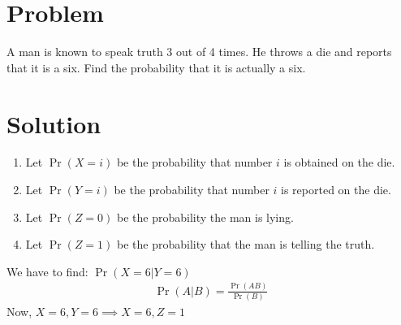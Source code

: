 \documentclass[journal,12pt,twocolumn]{IEEEtran}
\begin{document}
\section*{Problem}
A man is known to speak truth 3 out of 4 times. He throws a die and reports that it is a six. Find the probability that it is actually a six.
\section*{Solution}
\begin{enumerate}
    \item Let $\Pr(X=i)$ be the probability that number $i$ is obtained on the die.
    \item Let $\Pr(Y=i)$ be the probability that number $i$ is reported on the die.
    \item Let $\Pr(Z=0)$ be the probability the man is lying.
    \item Let $\Pr(Z=1)$ be the probability that the man is telling the truth.
\end{enumerate}
We have to find: $\Pr(X=6|Y=6)$
\begin{align}
\Pr(A|B)=\frac{\Pr(AB)}{\Pr(B)} 
\label{Bayes}
\end{align}
Now, $ X=6, Y=6 \implies X=6, Z=1 $ 
\end{document}
